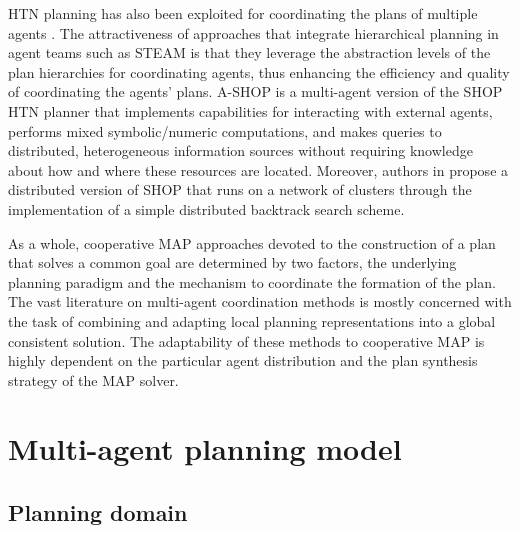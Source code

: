 \documentclass[12pt]{article}
\begin{document}
HTN planning has also been exploited for coordinating the plans of multiple agents \cite{Clement1999TheoryFC}.
The attractiveness of approaches that integrate hierarchical planning in agent teams such as STEAM \cite{Tambe1997TowardsFT} is that they leverage the abstraction levels of the plan hierarchies for coordinating agents, thus enhancing the efficiency and quality of coordinating the agents’ plans.
A-SHOP \cite{Dix2003IMPACTingSP} is a multi-agent version of the SHOP HTN planner \cite{Nau_2003} that implements capabilities for interacting with external agents, performs mixed symbolic/numeric computations, and makes queries to distributed, heterogeneous information sources without requiring knowledge about how and where these resources are located.
Moreover, authors in \cite{Kabanza2005DISTRIBUTEDHT} propose a distributed version of SHOP that runs on a network of clusters through the implementation of a simple distributed backtrack search scheme.

As a whole, cooperative MAP approaches devoted to the construction of a plan that solves a common goal are determined by two factors, the underlying planning paradigm and the mechanism to coordinate the formation of the plan.
The vast literature on multi-agent coordination methods is mostly concerned with the task of combining and adapting local planning representations into a global consistent solution.
The adaptability of these methods to cooperative MAP is highly dependent on the particular agent distribution and the plan synthesis strategy of the MAP solver.

\section{Multi-agent planning model}

\subsection{Planning domain}
\end{document}

